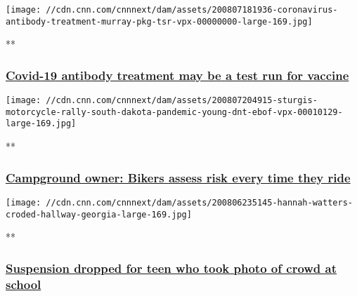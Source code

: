 \href{/videos/health/2020/08/07/coronavirus-antibody-treatment-murray-pkg-tsr-vpx.cnn/video/playlists/top-news-videos/}{}

\texttt{[image: //cdn.cnn.com/cnnnext/dam/assets/200807181936-coronavirus-antibody-treatment-murray-pkg-tsr-vpx-00000000-large-169.jpg]}

**

\hypertarget{covid-19-antibody-treatment-may-be-a-test-run-for-vaccine}{%
\subsubsection{\texorpdfstring{\href{/videos/health/2020/08/07/coronavirus-antibody-treatment-murray-pkg-tsr-vpx.cnn/video/playlists/top-news-videos/}{Covid-19
antibody treatment may be a test run for
vaccine}}{Covid-19 antibody treatment may be a test run for vaccine}}\label{covid-19-antibody-treatment-may-be-a-test-run-for-vaccine}}

\href{/videos/us/2020/08/08/sturgis-motorcycle-rally-south-dakota-pandemic-young-dnt-ebof-vpx.cnn/video/playlists/top-news-videos/}{}

\texttt{[image: //cdn.cnn.com/cnnnext/dam/assets/200807204915-sturgis-motorcycle-rally-south-dakota-pandemic-young-dnt-ebof-vpx-00010129-large-169.jpg]}

**

\hypertarget{campground-owner-bikers-assess-risk-every-time-they-ride}{%
\subsubsection{\texorpdfstring{\href{/videos/us/2020/08/08/sturgis-motorcycle-rally-south-dakota-pandemic-young-dnt-ebof-vpx.cnn/video/playlists/top-news-videos/}{Campground
owner: Bikers assess risk every time they
ride}}{Campground owner: Bikers assess risk every time they ride}}\label{campground-owner-bikers-assess-risk-every-time-they-ride}}

\href{/videos/us/2020/08/08/georgia-teen-school-suspension-overturned-tuchman-pkg-ac360-vpx.cnn/video/playlists/top-news-videos/}{}

\texttt{[image: //cdn.cnn.com/cnnnext/dam/assets/200806235145-hannah-watters-croded-hallway-georgia-large-169.jpg]}

**

\hypertarget{suspension-dropped-for-teen-who-took-photo-of-crowd-at-school}{%
\subsubsection{\texorpdfstring{\href{/videos/us/2020/08/08/georgia-teen-school-suspension-overturned-tuchman-pkg-ac360-vpx.cnn/video/playlists/top-news-videos/}{Suspension
dropped for teen who took photo of crowd at
school}}{Suspension dropped for teen who took photo of crowd at school}}\label{suspension-dropped-for-teen-who-took-photo-of-crowd-at-school}}

